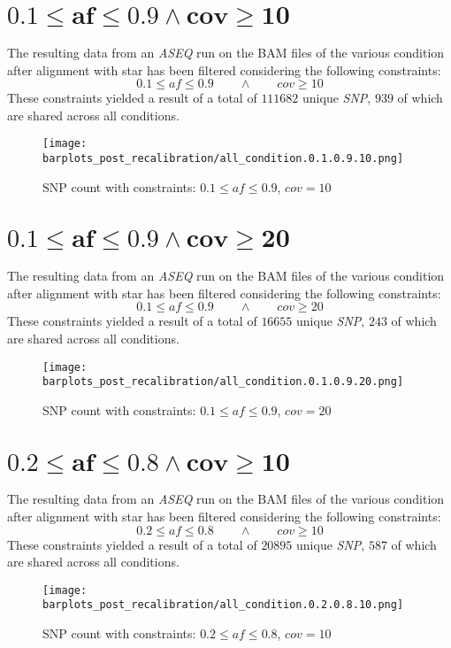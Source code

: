 \documentclass{article}
\begin{document}
\section*{$\mathbf{0.1\le af\le 0.9\land cov\ge 10}$}
The resulting data from an \emph{ASEQ} run on the BAM files of the various condition after alignment with star has been filtered considering the following constraints:
  $$0.1\le af\le 0.9\qquad\land\qquad cov\ge 10$$
	These constraints yielded a result of a total of $111682$ unique \emph{SNP}, $939$ of which are shared across all conditions.
\begin{figure}[H]
  \texttt{[image: barplots\_post\_recalibration/all\_condition.0.1.0.9.10.png]}
\caption{SNP count with constraints: $0.1\le af \le 0.9$, $cov = 10$ }
\end{figure}


\section*{$\mathbf{0.1\le af\le 0.9\land cov\ge 20}$}
The resulting data from an \emph{ASEQ} run on the BAM files of the various condition after alignment with star has been filtered considering the following constraints:
  $$0.1\le af\le 0.9\qquad\land\qquad cov\ge 20$$
	These constraints yielded a result of a total of $16655$ unique \emph{SNP}, $243$ of which are shared across all conditions.
\begin{figure}[H]
  \texttt{[image: barplots\_post\_recalibration/all\_condition.0.1.0.9.20.png]}
\caption{SNP count with constraints: $0.1\le af \le 0.9$, $cov = 20$ }
\end{figure}


\section*{$\mathbf{0.2\le af\le 0.8\land cov\ge 10}$}
The resulting data from an \emph{ASEQ} run on the BAM files of the various condition after alignment with star has been filtered considering the following constraints:
  $$0.2\le af\le 0.8\qquad\land\qquad cov\ge 10$$
	These constraints yielded a result of a total of $20895$ unique \emph{SNP}, $587$ of which are shared across all conditions.
\begin{figure}[H]
  \texttt{[image: barplots\_post\_recalibration/all\_condition.0.2.0.8.10.png]}
\caption{SNP count with constraints: $0.2\le af \le 0.8$, $cov = 10$ }
\end{figure}

\end{document}
